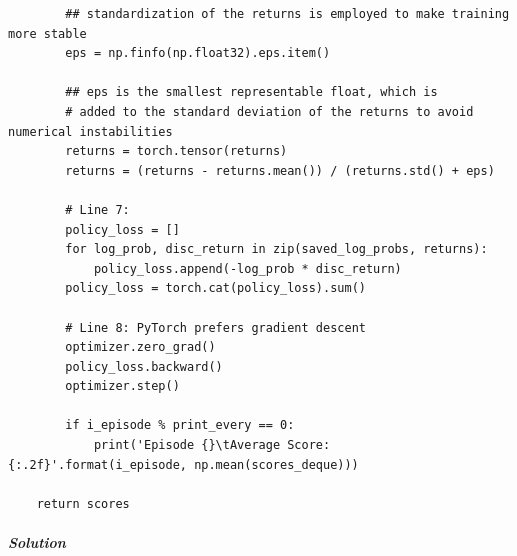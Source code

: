 \documentclass[11pt,a4paper]{article}
\begin{document}
\begin{lstlisting}
        ## standardization of the returns is employed to make training more stable
        eps = np.finfo(np.float32).eps.item()

        ## eps is the smallest representable float, which is
        # added to the standard deviation of the returns to avoid numerical instabilities
        returns = torch.tensor(returns)
        returns = (returns - returns.mean()) / (returns.std() + eps)

        # Line 7:
        policy_loss = []
        for log_prob, disc_return in zip(saved_log_probs, returns):
            policy_loss.append(-log_prob * disc_return)
        policy_loss = torch.cat(policy_loss).sum()

        # Line 8: PyTorch prefers gradient descent
        optimizer.zero_grad()
        policy_loss.backward()
        optimizer.step()

        if i_episode % print_every == 0:
            print('Episode {}\tAverage Score: {:.2f}'.format(i_episode, np.mean(scores_deque)))

    return scores
\end{lstlisting}

\subparagraph{Solution}\label{solution-1}
\end{document}
